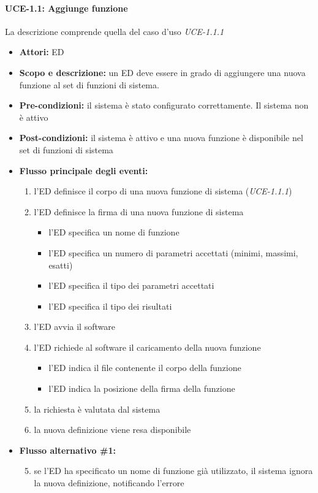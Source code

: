 \paragraph{UCE-1.1: Aggiunge funzione}

La descrizione comprende quella del caso d'uso \emph{UCE-1.1.1}

\begin{itemize}
	\item \textbf{Attori:} ED
	\item \textbf{Scopo e descrizione:} un ED deve essere in grado di aggiungere una nuova funzione al set di funzioni di sistema.
	\item \textbf{Pre-condizioni:} il sistema è stato configurato correttamente. Il sistema non è attivo
	\item \textbf{Post-condizioni:} il sistema è attivo e una nuova funzione è disponibile nel set di funzioni di sistema
	\item \textbf{Flusso principale degli eventi:}
		\begin{enumerate}
			\item l'ED definisce il corpo di una nuova funzione di sistema (\emph{UCE-1.1.1})
			\item l'ED definisce la firma di una nuova funzione di sistema
				\begin{itemize}
					\item l'ED specifica un nome di funzione
					\item l'ED specifica un numero di parametri accettati (minimi, massimi, esatti)
					\item l'ED specifica il tipo dei parametri accettati
					\item l'ED specifica il tipo dei risultati
				\end{itemize}
			\item l'ED avvia il software
			\item l'ED richiede al software il caricamento della nuova funzione
				\begin{itemize}
					\item l'ED indica il file contenente il corpo della funzione
					\item l'ED indica la posizione della firma della funzione
				\end{itemize}
			\item la richiesta è valutata dal sistema
			\item la nuova definizione viene resa disponibile
		\end{enumerate}
	\item \textbf{Flusso alternativo \#1:}
		\begin{enumerate}
			\setcounter{enumi}{4}
			\item se l'ED ha specificato un nome di funzione già utilizzato, il sistema ignora la nuova definizione, notificando l'errore
		\end{enumerate}


\end{itemize}
